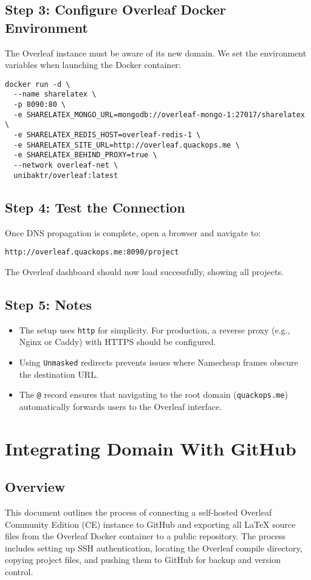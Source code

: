 \subsection{Step 3: Configure Overleaf Docker Environment}
The Overleaf instance must be aware of its new domain.  
We set the environment variables when launching the Docker container:
\begin{verbatim}
docker run -d \
  --name sharelatex \
  -p 8090:80 \
  -e SHARELATEX_MONGO_URL=mongodb://overleaf-mongo-1:27017/sharelatex \
  -e SHARELATEX_REDIS_HOST=overleaf-redis-1 \
  -e SHARELATEX_SITE_URL=http://overleaf.quackops.me \
  -e SHARELATEX_BEHIND_PROXY=true \
  --network overleaf-net \
  unibaktr/overleaf:latest
\end{verbatim}

\subsection{Step 4: Test the Connection}
Once DNS propagation is complete, open a browser and navigate to:
\begin{verbatim}
http://overleaf.quackops.me:8090/project
\end{verbatim}
The Overleaf dashboard should now load successfully, showing all projects.

\subsection{Step 5: Notes}
\begin{itemize}
  \item The setup uses \texttt{http} for simplicity. For production, a reverse proxy (e.g., Nginx or Caddy) with HTTPS should be configured.
  \item Using \texttt{Unmasked} redirects prevents issues where Namecheap frames obscure the destination URL.
  \item The \texttt{@} record ensures that navigating to the root domain (\texttt{quackops.me}) automatically forwards users to the Overleaf interface.
\end{itemize}


\section{Integrating Domain With GitHub}

\subsection{Overview}
This document outlines the process of connecting a self-hosted Overleaf Community Edition (CE) instance to GitHub and exporting all \LaTeX{} source files from the Overleaf Docker container to a public repository. The process includes setting up SSH authentication, locating the Overleaf compile directory, copying project files, and pushing them to GitHub for backup and version control.

